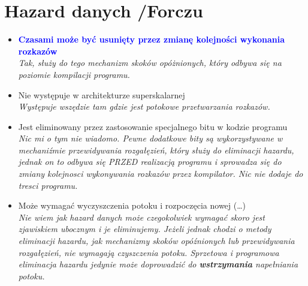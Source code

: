 \documentclass[a4paper,twoside]{article}
\begin{document}
\section{Hazard danych {\small /Forczu}}
	\begin{itemize}
    \item \textcolor{Blue}{\textbf{Czasami może być usunięty przez zmianę kolejności wykonania rozkazów}}\\
    {\small \emph{Tak, służy do tego mechanizm skoków opóżnionych, który odbywa się na poziomie kompilacji programu.}}
    \item Nie występuje w architekturze superskalarnej\\
    {\small \emph{Występuje wszędzie tam gdzie jest potokowe przetwarzania rozkazów.}}
    \item Jest eliminowany przez zastosowanie specjalnego bitu w kodzie programu\\
    {\small \emph{Nic mi o tym nie wiadomo. Pewne dodatkowe bity są wykorzystywane w mechaniźmie przewidywania rozgałęzień, który służy do eliminacji hazardu, jednak on to odbywa się PRZED realizacją programu i sprowadza się do zmiany kolejnosci wykonywania rozkazów przez kompilator. Nic nie dodaje do tresci programu.}}
    \item Może wymagać wyczyszczenia potoku i rozpoczęcia nowej (…)\\
    {\small \emph{Nie wiem jak hazard danych może czegokolwiek wymagać skoro jest zjawiskiem ubocznym i je eliminujemy. Jeżeli jednak chodzi o metody eliminacji hazardu, jak mechanizmy skoków opóźnionych lub przewidywania rozgałęzień, nie wymagają czyszczenia potoku. Sprzetowa i programowa eliminacja hazardu jedynie może doprowadzić do \textbf{wstrzymania} napełniania potoku.}}
    \end{itemize}
\end{document}
